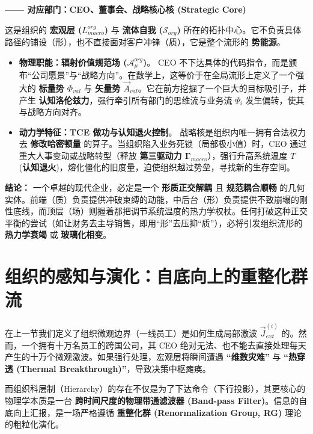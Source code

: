 
\textbf{—— 对应部门：CEO、董事会、战略核心核 (Strategic Core)}

这是组织的 \textbf{宏观层 ($L_{macro}^{org}$)} 与 \textbf{流体自我 ($\mathcal{S}_{org}$)} 所在的拓扑中心。它不负责具体路径的铺设（形），也不直接面对客户冲锋（质），它是整个流形的 \textbf{势能源}。

\begin{itemize}
    \item \textbf{物理职能：辐射价值规范场 ($\mathcal{A}_\mu^{org}$)}。
    CEO 不下达具体的代码指令，而是颁布“公司愿景”与“战略方向”。在数学上，这等价于在全局流形上定义了一个强大的 \textbf{标量势 $\Phi_{val}$} 与 \textbf{矢量势 $\vec{A}_{val}$}。它在前方挖掘了一个巨大的目标吸引子，并产生 \textbf{认知洛伦兹力}，强行牵引所有部门的思维流与业务流 $\Psi_i$ 发生偏转，使其与战略方向对齐。

    \item \textbf{动力学特征：TCE 做功与认知退火控制}。
    战略核是组织内唯一拥有合法权力去 \textbf{修改哈密顿量} 的算子。当组织陷入业务死锁（局部极小值）时，CEO 通过重大人事变动或战略转型（释放 \textbf{第三驱动力 $\mathbf{\Gamma}_{macro}$}），强行升高系统温度 $T$ (\textbf{认知退火})，熔化僵化的旧度量，迫使组织越过势垒，寻找新的生存空间。
\end{itemize}

\textbf{结论：} 一个卓越的现代企业，必定是一个 \textbf{形质正交解耦} 且 \textbf{规范耦合顺畅} 的几何实体。前端（质）负责提供冲破束缚的动能，中后台（形）负责提供不致崩塌的刚性底线，而顶层（场）则握着那把调节系统温度的热力学权杖。任何打破这种正交平衡的尝试（如让财务去主导销售，即用“形”去压抑“质”），必将引发组织流形的 \textbf{热力学衰竭} 或 \textbf{玻璃化相变}。


\section{组织的感知与演化：自底向上的重整化群流}
\label{sec:org_renormalization_evolution}

在上一节我们定义了组织微观边界（一线员工）是如何生成局部激波 $\vec{J}_{ext}^{(i)}$ 的。然而，一个拥有十万名员工的跨国公司，其 CEO 绝对无法、也不能去直接处理每天产生的十万个微观激波。如果强行处理，宏观层将瞬间遭遇 \textbf{“维数灾难”} 与 \textbf{“热穿透 (Thermal Breakthrough)”}，导致决策中枢瘫痪。

而组织科层制（Hierarchy）的存在不仅是为了下达命令（下行投影），其更核心的物理学本质是一台 \textbf{跨时间尺度的物理带通滤波器 (Band-pass Filter)}。信息的自底向上汇报，是一场严格遵循 \textbf{重整化群 (Renormalization Group, RG)} 理论的粗粒化演化。

